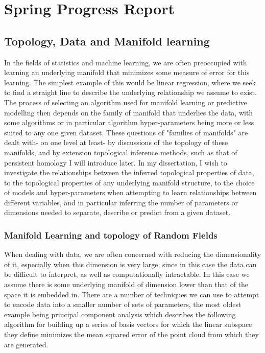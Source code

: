 \documentclass[a4paper,12pt]{report}
\theoremstyle{definition}
\begin{document}
\chapter*{Spring Progress Report}
\section*{Topology, Data and Manifold learning}
In the fields of statistics and machine learning, we are often preoccupied with learning an underlying manifold that minimizes some measure of error for this learning. The simplest example of this would be linear regression, where we seek to find a straight line to describe the underlying relationship we assume to exist. The process of selecting an algorithm used for manifold learning or predictive modelling then depends on the family of manifold that underlies the data, with some algorithms or in particular algorithm hyper-parameters being more or less suited to any one given dataset. These questions of "families of manifolds" are dealt with- on one level at least- by discussions of the topology of these manifolds, and by extension topological inference methods, such as that of persistent homology I will introduce later. In my dissertation, I wish to investigate the relationships between the inferred topological properties of data, to the topological properties of any underlying manifold structure, to the choice of models and hyper-parameters when attempting to learn relationships between different variables, and  in particular inferring the number of parameters or dimensions needed to separate, describe or predict from a given dataset.

 \subsection*{Manifold Learning and topology of Random Fields}
 When dealing with data, we are often concerned with reducing the dimensionality of it, especially when this dimension is very large; since in this case the data can be difficult to interpret, as well as computationally intractable. In this case we assume there is some underlying manifold of dimension lower than that of the space it is embedded in. There are a number of techniques we can use to attempt to encode data into a smaller number of sets of parameters, the most oldest example being principal component analysis \cite{pca} which describes the following algorithm for building up a series of basis vectors for which the linear subspace they define minimizes the mean squared error of the point cloud from which they are generated. 
 
\end{document}
